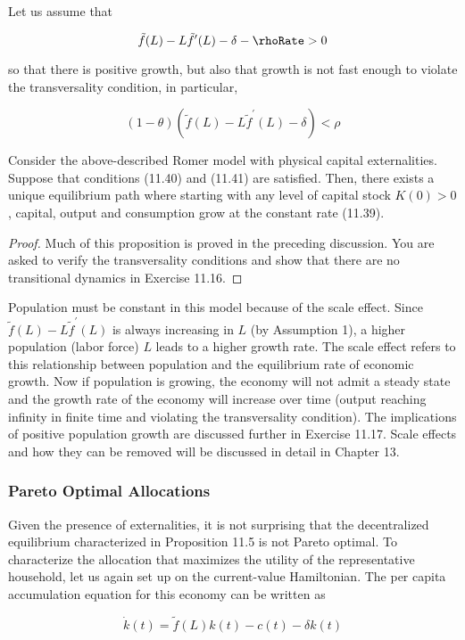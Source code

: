 \documentclass[\topdir/lecture\_notes.tex]{subfiles}
\begin{document}
Let us assume that

\[
\tilde{f}(L)-L \tilde{f}^{\prime}(L)-\delta-\rhoRate > 0
\]

so that there is positive growth, but also that growth is not fast enough to violate the transversality condition, in particular,

\[
(1-\theta)\left(\tilde{f}(L)-L \tilde{f}^{\prime}(L)-\delta\right)<\rho
\]

\begin{proposition}
Consider the above-described Romer model with physical capital externalities. Suppose that conditions (11.40) and (11.41) are satisfied. Then, there exists
a unique equilibrium path where starting with any level of capital stock $K(0)>0$, capital, output and consumption grow at the constant rate (11.39).
\end{proposition}
\begin{proof}
Much of this proposition is proved in the preceding discussion. You are asked to verify the transversality conditions and show that there are no transitional dynamics in Exercise 11.16.
\end{proof}

Population must be constant in this model because of the scale effect. Since $\tilde{f}(L)-L \tilde{f}^{\prime}(L)$ is always increasing in $L$ (by Assumption 1), a higher population (labor force) $L$ leads to a higher growth rate. The scale effect refers to this relationship between population and the equilibrium rate of economic growth. Now if population is growing, the economy will not admit a steady state and the growth rate of the economy will increase over time (output reaching infinity in finite time and violating the transversality condition). The implications of positive population growth are discussed further in Exercise 11.17. Scale effects and how they can be removed will be discussed in detail in Chapter 13.\\
\subsubsection{Pareto Optimal Allocations}
Given the presence of externalities, it is not surprising that the decentralized equilibrium characterized in Proposition 11.5 is not Pareto optimal. To characterize the allocation that maximizes the utility of the representative household, let us again set up on the current-value Hamiltonian. The per capita accumulation equation for this economy can be written as

\[
\dot{k}(t)=\tilde{f}(L) k(t)-c(t)-\delta k(t)
\]
\end{document}
